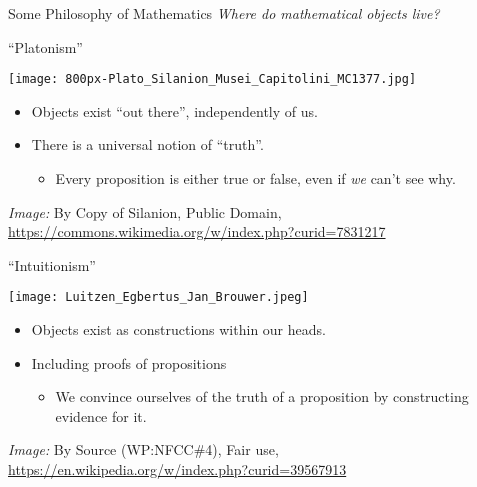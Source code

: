 \documentclass[xetex,aspectratio=169,14pt,hyperref={pdfpagelabels=true,pdflang={en-GB}}]{beamer}
\begin{document}
\begin{frame}
  {Some Philosophy of Mathematics}
  \emph{Where do mathematical objects live?}\\
\end{frame}

\begin{frame}
  {``Platonism''}

  \begin{center}
    \texttt{[image: 800px-Plato\_Silanion\_Musei\_Capitolini\_MC1377.jpg]}
  \end{center}

  \begin{itemize}
  \item Objects exist ``out there'', independently of us.
  \item There is a universal notion of ``truth''.
    \begin{itemize}
    \item Every proposition is either true or false, even if \emph{we}
      can't see why.
    \end{itemize}
  \end{itemize}

  {\tiny
    \emph{Image: }By Copy of Silanion, Public Domain, \url{https://commons.wikimedia.org/w/index.php?curid=7831217}}
\end{frame}

\begin{frame}
  {``Intuitionism''}

  \begin{center}
    \texttt{[image: Luitzen\_Egbertus\_Jan\_Brouwer.jpeg]}
  \end{center}

  \begin{itemize}
  \item Objects exist as constructions within our heads.
  \item Including proofs of propositions
    \begin{itemize}
    \item We convince ourselves of the truth of a proposition by
      constructing evidence for it.
    \end{itemize}
  \end{itemize}

  {\tiny
  \emph{Image: }By Source (WP:NFCC\#4), Fair use, \url{https://en.wikipedia.org/w/index.php?curid=39567913}}
\end{frame}
\end{document}
